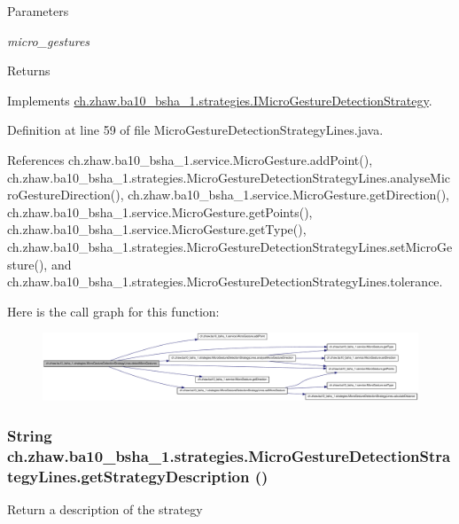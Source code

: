\begin{DoxyParams}{Parameters}
\item[{\em micro\_\-gestures}]\end{DoxyParams}
\begin{DoxyReturn}{Returns}

\end{DoxyReturn}


Implements \hyperlink{interfacech_1_1zhaw_1_1ba10__bsha__1_1_1strategies_1_1IMicroGestureDetectionStrategy_a8593331fb67e5d4dc890d3db9f2d1b58}{ch.zhaw.ba10\_\-bsha\_\-1.strategies.IMicroGestureDetectionStrategy}.

Definition at line 59 of file MicroGestureDetectionStrategyLines.java.

References ch.zhaw.ba10\_\-bsha\_\-1.service.MicroGesture.addPoint(), ch.zhaw.ba10\_\-bsha\_\-1.strategies.MicroGestureDetectionStrategyLines.analyseMicroGestureDirection(), ch.zhaw.ba10\_\-bsha\_\-1.service.MicroGesture.getDirection(), ch.zhaw.ba10\_\-bsha\_\-1.service.MicroGesture.getPoints(), ch.zhaw.ba10\_\-bsha\_\-1.service.MicroGesture.getType(), ch.zhaw.ba10\_\-bsha\_\-1.strategies.MicroGestureDetectionStrategyLines.setMicroGesture(), and ch.zhaw.ba10\_\-bsha\_\-1.strategies.MicroGestureDetectionStrategyLines.tolerance.

Here is the call graph for this function:\nopagebreak
\begin{figure}[H]
\begin{center}
\leavevmode
\includegraphics[width=420pt]{classch_1_1zhaw_1_1ba10__bsha__1_1_1strategies_1_1MicroGestureDetectionStrategyLines_ac4a6ad22e6ca3b595006c0b956fdd208_cgraph}
\end{center}
\end{figure}
\hypertarget{classch_1_1zhaw_1_1ba10__bsha__1_1_1strategies_1_1MicroGestureDetectionStrategyLines_a268ab1d51d959092f2d9a68044cc818d}{
\subsubsection[{getStrategyDescription}]{\setlength{\rightskip}{0pt plus 5cm}String ch.zhaw.ba10\_\-bsha\_\-1.strategies.MicroGestureDetectionStrategyLines.getStrategyDescription ()}}
\label{classch_1_1zhaw_1_1ba10__bsha__1_1_1strategies_1_1MicroGestureDetectionStrategyLines_a268ab1d51d959092f2d9a68044cc818d}
Return a description of the strategy


